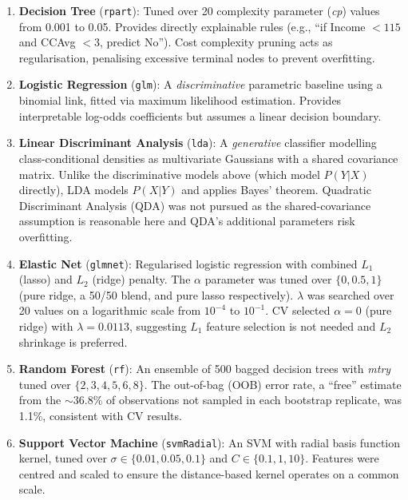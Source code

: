 \begin{enumerate}
    \item \textbf{Decision Tree} (\texttt{rpart}): Tuned over 20 complexity parameter (\textit{cp}) values from 0.001 to 0.05. Provides directly explainable rules (e.g., ``if Income $< 115$ and CCAvg $< 3$, predict No''). Cost complexity pruning acts as regularisation, penalising excessive terminal nodes to prevent overfitting.

    \item \textbf{Logistic Regression} (\texttt{glm}): A \emph{discriminative} parametric baseline using a binomial link, fitted via maximum likelihood estimation. Provides interpretable log-odds coefficients but assumes a linear decision boundary.

    \item \textbf{Linear Discriminant Analysis} (\texttt{lda}): A \emph{generative} classifier modelling class-conditional densities as multivariate Gaussians with a shared covariance matrix. Unlike the discriminative models above (which model $P(Y|X)$ directly), LDA models $P(X|Y)$ and applies Bayes' theorem. Quadratic Discriminant Analysis (QDA) was not pursued as the shared-covariance assumption is reasonable here and QDA's additional parameters risk overfitting.

    \item \textbf{Elastic Net} (\texttt{glmnet}): Regularised logistic regression with combined $L_1$ (lasso) and $L_2$ (ridge) penalty. The $\alpha$ parameter was tuned over $\{0, 0.5, 1\}$ (pure ridge, a 50/50 blend, and pure lasso respectively). $\lambda$ was searched over 20 values on a logarithmic scale from $10^{-4}$ to $10^{-1}$. CV selected $\alpha=0$ (pure ridge) with $\lambda=0.0113$, suggesting $L_1$ feature selection is not needed and $L_2$ shrinkage is preferred.

    \item \textbf{Random Forest} (\texttt{rf}): An ensemble of 500 bagged decision trees with \textit{mtry} tuned over $\{2,3,4,5,6,8\}$. The out-of-bag (OOB) error rate, a ``free'' estimate from the ${\sim}36.8\%$ of observations not sampled in each bootstrap replicate, was 1.1\%, consistent with CV results.

    \item \textbf{Support Vector Machine} (\texttt{svmRadial}): An SVM with radial basis function kernel, tuned over $\sigma \in \{0.01, 0.05, 0.1\}$ and $C \in \{0.1, 1, 10\}$. Features were centred and scaled to ensure the distance-based kernel operates on a common scale.


\end{enumerate}
